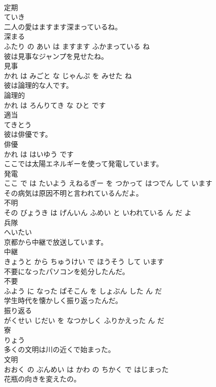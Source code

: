 \documentclass[8pt]{extreport}
\begin{document}
\begin{CJK}{UTF8}{min}
\\	定期	
\\	ていき			
\\	二人の愛はますます深まっているね。	
\\	深まる 
\\	ふたり の あい は ますます ふかまっている ね			
\\	彼は見事なジャンプを見せたね。	
\\	見事 
\\	かれ は みごと な じゃんぷ を みせた ね			
\\	彼は論理的な人です。	
\\	論理的 
\\	かれ は ろんりてき な ひと です			
\\	適当	
\\	てきとう			
\\	彼は俳優です。	
\\	俳優 
\\	かれ は はいゆう です			
\\	ここでは太陽エネルギーを使って発電しています。	
\\	発電 
\\	ここ で は たいよう えねるぎー を つかって はつでん して います			
\\	その病気は原因不明と言われているんだよ。	
\\	不明 
\\	その びょうき は げんいん ふめい と いわれている ん だ よ			
\\	兵隊	
\\	へいたい			
\\	京都から中継で放送しています。	
\\	中継 
\\	きょうと から ちゅうけい で ほうそう して います			
\\	不要になったパソコンを処分したんだ。	
\\	不要 
\\	ふよう に なった ぱそこん を しょぶん した ん だ			
\\	学生時代を懐かしく振り返ったんだ。	
\\	振り返る 
\\	がくせい じだい を なつかしく ふりかえった ん だ			
\\	寮	
\\	りょう			
\\	多くの文明は川の近くで始まった。	
\\	文明 
\\	おおく の ぶんめい は かわ の ちかく で はじまった			
\\	花瓶の向きを変えたの。	

\end{CJK}
\end{document}
